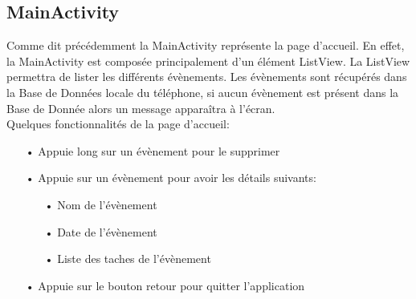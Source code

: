 \documentclass[12pt,a4paper]{report}
\begin{document}
\subsection{MainActivity}
\begin{flushleft}
\justify
Comme dit précédemment la MainActivity représente la page d'accueil. En effet, la MainActivity est composée principalement d'un élément ListView. La ListView permettra de lister les différents évènements. Les évènements sont récupérés dans la Base de Données locale du téléphone, si aucun évènement est présent dans la Base de Donnée alors un message apparaîtra à l'écran.\\

Quelques fonctionnalités de la page d'accueil:
\begin{itemize}
\item[•] Appuie long sur un évènement pour le supprimer
\item[•] Appuie sur un évènement pour avoir les détails suivants:
\begin{itemize}
\item[•] Nom de l'évènement
\item[•] Date de l'évènement
\item[•] Liste des taches de l'évènement
\end{itemize}
\item[•] Appuie sur le bouton retour pour quitter l'application
\end{itemize}
\begin{figure}[!h]
    \centering
    \begin{subfigure}[b]{0.3\textwidth}

\end{subfigure}
\end{figure}
\end{flushleft}
\end{document}
